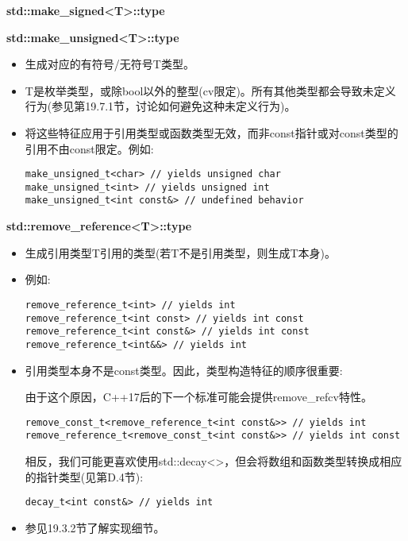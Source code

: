 \textbf{std::make\_signed<T>::type}

\textbf{std::make\_unsigned<T>::type}

\begin{itemize}
\item
生成对应的有符号/无符号T类型。

\item
T是枚举类型，或除bool以外的整型(cv限定)。所有其他类型都会导致未定义行为(参见第19.7.1节，讨论如何避免这种未定义行为)。

\item
将这些特征应用于引用类型或函数类型无效，而非const指针或对const类型的引用不由const限定。例如:
\begin{lstlisting}[style=styleCXX]
make_unsigned_t<char> // yields unsigned char
make_unsigned_t<int> // yields unsigned int
make_unsigned_t<int const&> // undefined behavior
\end{lstlisting}
\end{itemize}

\textbf{std::remove\_reference<T>::type}

\begin{itemize}
\item
生成引用类型T引用的类型(若T不是引用类型，则生成T本身)。

\item
例如:
\begin{lstlisting}[style=styleCXX]
remove_reference_t<int> // yields int
remove_reference_t<int const> // yields int const
remove_reference_t<int const&> // yields int const
remove_reference_t<int&&> // yields int
\end{lstlisting}

\item
引用类型本身不是const类型。因此，类型构造特征的顺序很重要:

\begin{tcolorbox}[colback=webgreen!5!white,colframe=webgreen!75!black]
\hspace*{0.75cm}由于这个原因，C++17后的下一个标准可能会提供remove\_refcv特性。
\end{tcolorbox}

\begin{lstlisting}[style=styleCXX]
remove_const_t<remove_reference_t<int const&>> // yields int
remove_reference_t<remove_const_t<int const&>> // yields int const
\end{lstlisting}

相反，我们可能更喜欢使用std::decay<>，但会将数组和函数类型转换成相应的指针类型(见第D.4节):

\begin{lstlisting}[style=styleCXX]
decay_t<int const&> // yields int
\end{lstlisting}

\item
参见19.3.2节了解实现细节。
\end{itemize}

